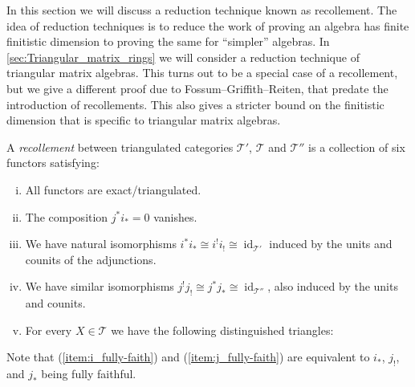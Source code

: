 In this section we will discuss a reduction technique known as recollement. The idea of reduction techniques is to reduce the work of proving an algebra has finite finitistic dimension to proving the same for ``simpler'' algebras. In \cref{sec:Triangular_matrix_rings} we will consider a reduction technique of triangular matrix algebras. This turns out to be a special case of a recollement, but we give a different proof due to Fossum--Griffith--Reiten, that predate the introduction of recollements. This also gives a stricter bound on the finitistic dimension that is specific to triangular matrix algebras.

\begin{defn}[Recollement]\label{def:recollement}
	A \emph{recollement} between triangulated categories $\mathcal T'$, $\mathcal T$ and $\mathcal T''$ is a collection of six functors satisfying:
\begin{center}
\end{center}

\begin{enumerate}[(i)]
	\item All functors are exact/triangulated.
	\item The composition $j^*i_*=0$ vanishes.
	\item \label{item:i_fully-faith} 
	We have natural isomorphisms $i^*i_* \cong i^!i_! \cong \operatorname{id}_{\mathcal T'}$ induced by the units and counits of the adjunctions. 
	\item \label{item:j_fully-faith}
	We have similar isomorphisms $j^!j_! \cong j^*j_* \cong \operatorname{id}_{\mathcal T''}$, also induced by the units and counits. 
	\item \label{recollement:triangles}
	For every $X \in \mathcal T$ we have the following distinguished triangles:
	\begin{center}
	\end{center}
\end{enumerate}
Note that (\ref{item:i_fully-faith}) and (\ref{item:j_fully-faith}) are equivalent to $i_*$, $j_!$, and $j_*$ being fully faithful.
\end{defn}

